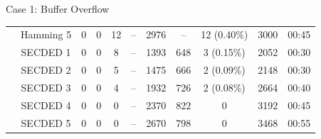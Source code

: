 \begin{frame}[noframenumbering]{Case 1: Buffer Overflow}
\begin{table}[H]
\begin{tabular}{@{}ccccccccccc@{}}
                                                               & Hamming 5 & 0     & 0      & 12    & --        & 2976                                     & --                                      & 12 {\tiny (0.40\%)}                           & 3000        & 00:45                           \\
                                                               & SECDED 1       & 0     & 0      & 8     & --        & 1393                                     & 648                                     & 3 {\tiny (0.15\%)}                            & 2052        & 00:30                           \\
                                                               & SECDED 2       & 0     & 0      & 5     & --        & 1475                                     & 666                                     & 2 {\tiny (0.09\%)}                            & 2148        & 00:30                           \\
                                                               & SECDED 3       & 0     & 0      & 4     & --        & 1932                                     & 726                                     & 2 {\tiny (0.08\%)}                            & 2664        & 00:40                           \\
                                                               & SECDED 4       & 0     & 0      & 0     & --        & 2370                                     & 822                                     & 0                                             & 3192        & 00:45                           \\
                                                               & SECDED 5       & 0     & 0      & 0     & --        & 2670                                     & 798                                     & 0                                             & 3468        & 00:55                           \\
            \bottomrule
        \end{tabular}
    \end{table}
\end{frame}

